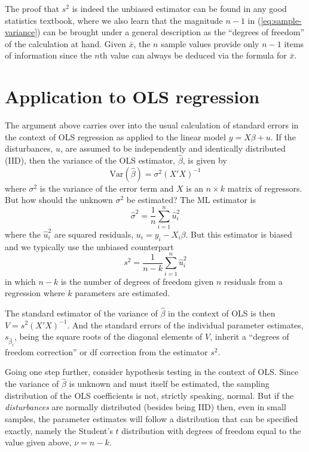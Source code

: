The proof that $s^2$ is indeed the unbiased estimator can be found in
any good statistics textbook, where we also learn that the magnitude
$n-1$ in (\ref{eq:sample-variance}) can be brought under a general
description as the ``degrees of freedom'' of the calculation at
hand. Given $\bar{x}$, the $n$ sample values provide only $n-1$ items
of information since the $n$th value can always be deduced via the
formula for $\bar{x}$.

\section{Application to OLS regression}

The argument above carries over into the usual calculation of standard
errors in the context of OLS regression as applied to the linear model
$y = X\beta + u$.  If the disturbances, $u$, are assumed to be
independently and identically distributed (IID), then the variance of
the OLS estimator, $\hat\beta$, is given by
%
\[
\mbox{Var}\left(\hat\beta\right) = \sigma^2 (X'X)^{-1}
\]
%
where $\sigma^2$ is the variance of the error term and $X$ is an
$n\times k$ matrix of regressors.  But how should the unknown
$\sigma^2$ be estimated?  The ML estimator is
%
\begin{equation}
\label{eq:ols-sigma2}
\hat\sigma^2 = \frac{1}{n} \sum_{i=1}^n \hat{u}^2_i
\end{equation}
%
where the $\hat{u}^2_i$ are squared residuals, $u_i = y_i - X_i\beta$.
But this estimator is biased and we typically use the unbiased
counterpart
%
\begin{equation}
\label{eq:ols-s2}
s^2 = \frac{1}{n-k} \sum_{i=1}^n \hat{u}_i^2
\end{equation}
%
in which $n - k$ is the number of degrees of freedom given $n$
residuals from a regression where $k$ parameters are estimated.

The standard estimator of the variance of $\hat\beta$ in the
context of OLS is then $V = s^2 (X'X)^{-1}$.  And the standard errors
of the individual parameter estimates, $s_{\hat{\beta}_i}$, being the
square roots of the diagonal elements of $V$, inherit a ``degrees of
freedom correction'' or df correction from the estimator $s^2$.

Going one step further, consider hypothesis testing in the context of
OLS.  Since the variance of $\hat\beta$ is unknown and must itself be
estimated, the sampling distribution of the OLS coefficients is not,
strictly speaking, normal.  But if the \textit{disturbances} are
normally distributed (besides being IID) then, even in small samples,
the parameter estimates will follow a distribution that can be
specified exactly, namely the Student's $t$ distribution with degrees
of freedom equal to the value given above, $\nu = n-k$.

